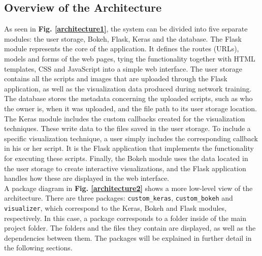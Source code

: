 \subsection{Overview of the Architecture}

As seen in \textbf{Fig. \ref{architecture1}}, the system can be divided into five separate modules: the user storage, Bokeh, Flask, Keras and the database. The Flask module represents the core of the application. It defines the routes (URLs), models and forms of the web pages, tying the functionality together with HTML templates, CSS and JavaScript into a simple web interface. The user storage contains all the scripts and images that are uploaded through the Flask application, as well as the visualization data produced during network training. The database stores the metadata concerning the uploaded scripts, such as who the owner is, when it was uploaded, and the file path to its user storage location. The Keras module includes the custom callbacks created for the visualization techniques. These write data to the files saved in the user storage. To include a specific visualization technique, a user simply includes the corresponding callback in his or her script. It is the Flask application that implements the functionality for executing these scripts. Finally, the Bokeh module uses the data located in the user storage to create interactive visualizations, and the Flask application handles how these are displayed in the web interface. \\

\noindent A package diagram in \textbf{Fig. \ref{architecture2}} shows a more low-level view of the architecture. There are three packages: \texttt{custom\_keras}, \texttt{custom\_bokeh} and \texttt{visualizer}, which correspond to the Keras, Bokeh and Flask modules, respectively. In this case, a package corresponds to a folder inside of the main project folder. The folders and the files they contain are displayed, as well as the dependencies between them. The packages will be explained in further detail in the following sections.



